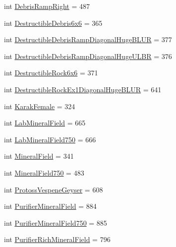 \begin{DoxyCompactItemize}
\item 
int \mbox{\hyperlink{classpysc2_1_1lib_1_1units_1_1_neutral_a2f3356b28866171e97553c9fb9e312ad}{Debris\+Ramp\+Right}} = 487
\item 
int \mbox{\hyperlink{classpysc2_1_1lib_1_1units_1_1_neutral_a3d33f8f26dad757e183f352f9a64f2dc}{Destructible\+Debris6x6}} = 365
\item 
int \mbox{\hyperlink{classpysc2_1_1lib_1_1units_1_1_neutral_a113654acaba97bd91b616cdf291da063}{Destructible\+Debris\+Ramp\+Diagonal\+Huge\+B\+L\+UR}} = 377
\item 
int \mbox{\hyperlink{classpysc2_1_1lib_1_1units_1_1_neutral_acbb0428afd8431d0a38f3360b9234630}{Destructible\+Debris\+Ramp\+Diagonal\+Huge\+U\+L\+BR}} = 376
\item 
int \mbox{\hyperlink{classpysc2_1_1lib_1_1units_1_1_neutral_a841a1c4e53107103e919e9142fd5c8b9}{Destructible\+Rock6x6}} = 371
\item 
int \mbox{\hyperlink{classpysc2_1_1lib_1_1units_1_1_neutral_ab1dcbcd47747a635b63dcbce1b118578}{Destructible\+Rock\+Ex1\+Diagonal\+Huge\+B\+L\+UR}} = 641
\item 
int \mbox{\hyperlink{classpysc2_1_1lib_1_1units_1_1_neutral_a700f25838a81188ae88d01ad5e3ab78e}{Karak\+Female}} = 324
\item 
int \mbox{\hyperlink{classpysc2_1_1lib_1_1units_1_1_neutral_a1dff180e1ac116ae7bfcf83d25f7b21c}{Lab\+Mineral\+Field}} = 665
\item 
int \mbox{\hyperlink{classpysc2_1_1lib_1_1units_1_1_neutral_a0cd4f93ed1f225d21abda60597f9ec22}{Lab\+Mineral\+Field750}} = 666
\item 
int \mbox{\hyperlink{classpysc2_1_1lib_1_1units_1_1_neutral_a0020d30d9df9c5e7d0b6fa272d6b9601}{Mineral\+Field}} = 341
\item 
int \mbox{\hyperlink{classpysc2_1_1lib_1_1units_1_1_neutral_a0865e4778c16e17ef6531327adefb235}{Mineral\+Field750}} = 483
\item 
int \mbox{\hyperlink{classpysc2_1_1lib_1_1units_1_1_neutral_a6682670e427abae006d5f7cb68d88989}{Protoss\+Vespene\+Geyser}} = 608
\item 
int \mbox{\hyperlink{classpysc2_1_1lib_1_1units_1_1_neutral_a7e21b8510aaf126a3662f89f982e9107}{Purifier\+Mineral\+Field}} = 884
\item 
int \mbox{\hyperlink{classpysc2_1_1lib_1_1units_1_1_neutral_a1fda5566b928ab5854316309a2237140}{Purifier\+Mineral\+Field750}} = 885
\item 
int \mbox{\hyperlink{classpysc2_1_1lib_1_1units_1_1_neutral_a0a05126799307b48e7b42f8e312b4016}{Purifier\+Rich\+Mineral\+Field}} = 796

\end{DoxyCompactItemize}
